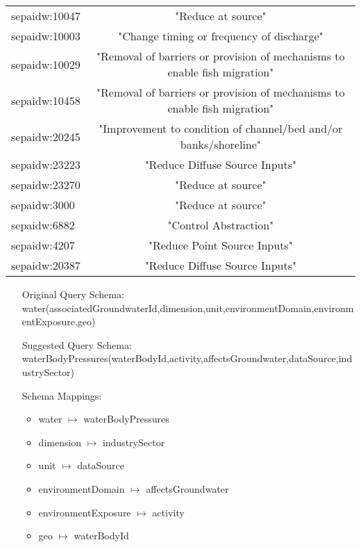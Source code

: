\documentclass[a4paper,10pt]{article}
\begin{document}
\begin{table}[!tb]
\begin{center}
\begin{tabular}{ l c}
sepaidw:10047  & "Reduce at source"        \\                                                                     
 sepaidw:10003  & "Change timing or frequency of discharge"      \\                                               
 sepaidw:10029  & "Removal of barriers or provision of mechanisms to enable fish migration"   \\                  
 sepaidw:10458  & "Removal of barriers or provision of mechanisms to enable fish migration"  \\                    
 sepaidw:20245  & "Improvement to condition of channel/bed and/or banks/shoreline"    \\                           
 sepaidw:23223  & "Reduce Diffuse Source Inputs"    \\                                                             
 sepaidw:23270  & "Reduce at source"  \\                                                                           
 sepaidw:3000   & "Reduce at source"   \\                                                                          
 sepaidw:6882   & "Control Abstraction"   \\                                                                       
 sepaidw:4207   & "Reduce Point Source Inputs"    \\                                                               
 sepaidw:20387  & "Reduce Diffuse Source Inputs"     \\                               

\end{tabular}
\label{waterBodyMeasures(waterBodyId,secondaryMeasure)}

\end{center}
\end{table}



\begin{itemize}
\item[Original Query Schema:]water(associatedGroundwaterId,dimension,unit,environmentDomain,environmentExposure,geo)
\item[Suggested Query Schema: ]
waterBodyPressures(waterBodyId,activity,affectsGroundwater,dataSource,industrySector) 
\item[Schema Mappings:] 
		\begin{itemize}
\item water $\mapsto$ waterBodyPressures
\item dimension $\mapsto$ industrySector
\item unit $\mapsto$ dataSource
\item environmentDomain $\mapsto$ affectsGroundwater
\item environmentExposure $\mapsto$ activity
\item geo $\mapsto$ waterBodyId

		\end{itemize}
\end{itemize}
\end{document}
